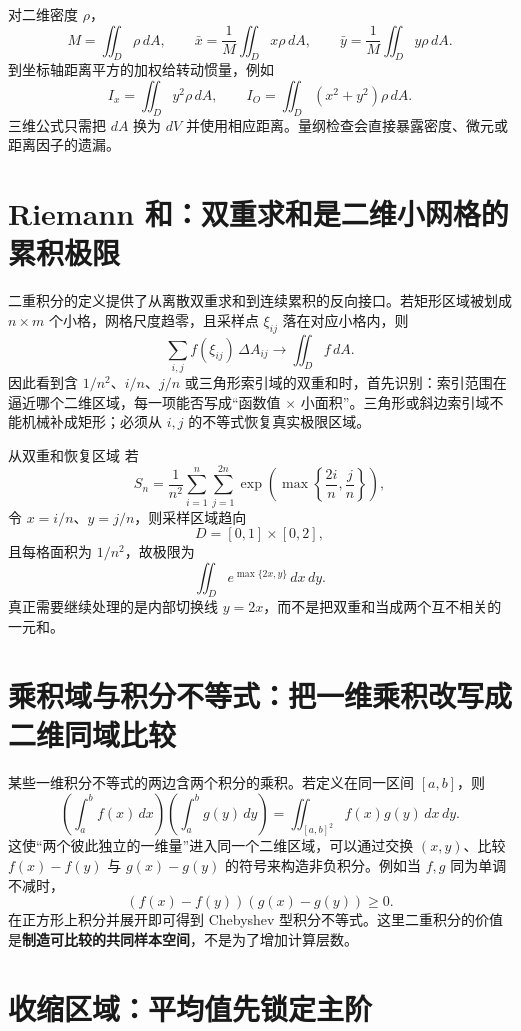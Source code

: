\documentclass[11pt,a4paper,fontset=fandol]{ctexart}
\begin{document}
对二维密度 $\rho$，
\[
M=\iint_D\rho\,dA,
\qquad
\bar x=\frac1M\iint_D x\rho\,dA,
\qquad
\bar y=\frac1M\iint_D y\rho\,dA.
\]
到坐标轴距离平方的加权给转动惯量，例如
\[
I_x=\iint_D y^2\rho\,dA,
\qquad
I_O=\iint_D(x^2+y^2)\rho\,dA.
\]
三维公式只需把 $dA$ 换为 $dV$ 并使用相应距离。量纲检查会直接暴露密度、微元或距离因子的遗漏。

\section{Riemann 和：双重求和是二维小网格的累积极限}

二重积分的定义提供了从离散双重求和到连续累积的反向接口。若矩形区域被划成 $n\times m$ 个小格，网格尺度趋零，且采样点 $\xi_{ij}$ 落在对应小格内，则
\[
\sum_{i,j} f(\xi_{ij})\,\Delta A_{ij}
\longrightarrow
\iint_D f\,dA.
\]
因此看到含 $1/n^2$、$i/n$、$j/n$ 或三角形索引域的双重和时，首先识别：索引范围在逼近哪个二维区域，每一项能否写成“函数值 $\times$ 小面积”。三角形或斜边索引域不能机械补成矩形；必须从 $i,j$ 的不等式恢复真实极限区域。

\begin{examplebox}{从双重和恢复区域}
若
\[
S_n=\frac1{n^2}\sum_{i=1}^{n}\sum_{j=1}^{2n}
\exp\!\left(\max\left\{\frac{2i}{n},\frac{j}{n}\right\}\right),
\]
令 $x=i/n$、$y=j/n$，则采样区域趋向
\[
D=[0,1]\times[0,2],
\]
且每格面积为 $1/n^2$，故极限为
\[
\iint_D e^{\max\{2x,y\}}\,dx\,dy.
\]
真正需要继续处理的是内部切换线 $y=2x$，而不是把双重和当成两个互不相关的一元和。
\end{examplebox}

\section{乘积域与积分不等式：把一维乘积改写成二维同域比较}

某些一维积分不等式的两边含两个积分的乘积。若定义在同一区间 $[a,b]$，则
\[
\left(\int_a^b f(x)\,dx\right)
\left(\int_a^b g(y)\,dy\right)
=
\iint_{[a,b]^2} f(x)g(y)\,dx\,dy.
\]
这使“两个彼此独立的一维量”进入同一个二维区域，可以通过交换 $(x,y)$、比较 $f(x)-f(y)$ 与 $g(x)-g(y)$ 的符号来构造非负积分。例如当 $f,g$ 同为单调不减时，
\[
(f(x)-f(y))(g(x)-g(y))\ge0.
\]
在正方形上积分并展开即可得到 Chebyshev 型积分不等式。这里二重积分的价值是\textbf{制造可比较的共同样本空间}，不是为了增加计算层数。

\section{收缩区域：平均值先锁定主阶}
\end{document}
